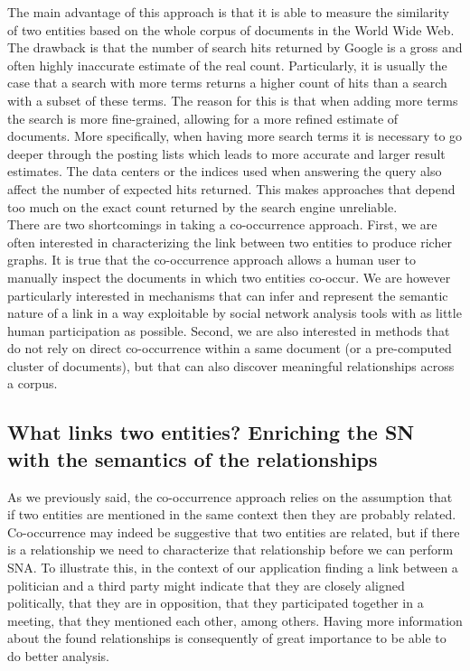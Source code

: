 The main advantage of this approach is that it is able to measure the similarity of two entities based on the whole corpus of documents in the World Wide Web. The drawback is that the number of search hits returned by Google is a gross and often highly inaccurate estimate of the real count. Particularly, it is usually the case that a search with more terms returns a higher count of hits than a search with a subset of these terms. The reason for this is that when adding more terms the search is more fine-grained, allowing for a more refined estimate of documents. More specifically, when having more search terms it is necessary to go deeper through the posting lists which leads to more accurate and larger result estimates. The data centers or the indices used when answering the query also affect the number of expected hits returned. This makes approaches that depend too much on the exact count returned by the search engine unreliable. \\

There are two shortcomings in taking a co-occurrence approach. First, we are often interested in characterizing the link between two entities to produce richer graphs. It is true that the co-occurrence approach allows a human user to manually inspect the documents in which two entities co-occur. We are however particularly interested in mechanisms that can infer and represent the semantic nature of a link in a way exploitable by social network analysis tools with as little human participation as possible. Second, we are also interested in methods that do not rely on direct co-occurrence within a same document (or a pre-computed cluster of documents), but that can also discover meaningful relationships across a corpus.\\

\subsection{What links two entities? Enriching the SN with the semantics of the relationships}\label{link-characterization}

As we previously said, the co-occurrence approach relies on the assumption that if two entities are mentioned in the same context then they are probably related. Co-occurrence may indeed be suggestive that two entities are related, but if there is a relationship we need to characterize that relationship before we can perform SNA. To illustrate this, in the context of our application finding a link between a politician and a third party might indicate that they are closely aligned politically, that they are in opposition, that they participated together in a meeting, that they mentioned each other, among others. Having more information about the found relationships is consequently of great importance to be able to do better analysis.  \\

